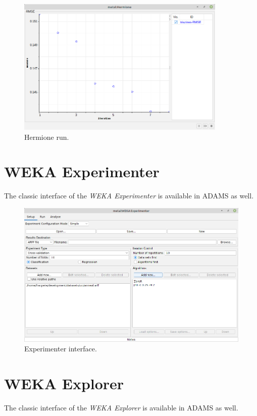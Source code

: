 \begin{figure}[htb]
  \centering
  \includegraphics[width=10.0cm]{images/hermione_run.png}
  \caption{Hermione run.}
  \label{hermione_run}
\end{figure}

\clearpage
\section{WEKA Experimenter}
The classic interface of the \textit{WEKA Experimenter} is available in ADAMS as well.

\begin{figure}[htb]
  \centering
  \includegraphics[width=12.0cm]{images/experimenter.png}
  \caption{Experimenter interface.}
  \label{experimenter}
\end{figure}

\clearpage
\section{WEKA Explorer}
The classic interface of the \textit{WEKA Explorer} is available in ADAMS as well.

